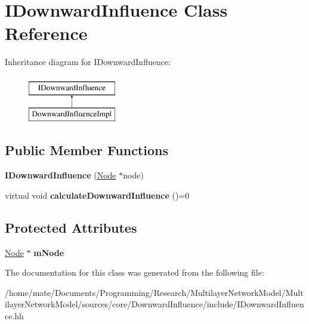 \hypertarget{classIDownwardInfluence}{}\section{I\+Downward\+Influence Class Reference}
\label{classIDownwardInfluence}
Inheritance diagram for I\+Downward\+Influence\+:\begin{figure}[H]
\begin{center}
\leavevmode
\includegraphics[height=2.000000cm]{classIDownwardInfluence}
\end{center}
\end{figure}
\subsection*{Public Member Functions}
\begin{DoxyCompactItemize}
\item 
{\bfseries I\+Downward\+Influence} (\hyperlink{classNode}{Node} $\ast$node)\hypertarget{classIDownwardInfluence_a7d5d6eb85ad3628703de8792dcebb9b5}{}\label{classIDownwardInfluence_a7d5d6eb85ad3628703de8792dcebb9b5}

\item 
virtual void {\bfseries calculate\+Downward\+Influence} ()=0\hypertarget{classIDownwardInfluence_ae6810945efb7ceb9b6e351c62bacd453}{}\label{classIDownwardInfluence_ae6810945efb7ceb9b6e351c62bacd453}

\end{DoxyCompactItemize}
\subsection*{Protected Attributes}
\begin{DoxyCompactItemize}
\item 
\hyperlink{classNode}{Node} $\ast$ {\bfseries m\+Node}\hypertarget{classIDownwardInfluence_aad871e67e020cdc589deb3739f8548a0}{}\label{classIDownwardInfluence_aad871e67e020cdc589deb3739f8548a0}

\end{DoxyCompactItemize}


The documentation for this class was generated from the following file\+:\begin{DoxyCompactItemize}
\item 
/home/mate/\+Documents/\+Programming/\+Research/\+Multilayer\+Network\+Model/\+Multilayer\+Network\+Model/sources/core/\+Downward\+Influence/include/I\+Downward\+Influence.\+hh\end{DoxyCompactItemize}
